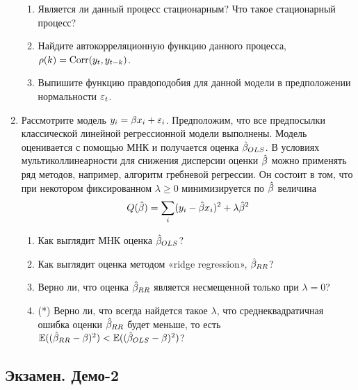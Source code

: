 \documentclass[12pt, a4paper]{article}
\theoremstyle{definition}
\begin{document}
\begin{enumerate}
\begin{enumerate}
\item Является ли данный процесс стационарным? Что такое стационарный процесс?
\item Найдите автокорреляционную функцию данного процесса, $\rho(k)=\operatorname{Corr}(y_t,y_{t-k})$.
\item Выпишите функцию правдоподобия для данной модели в предположении нормальности $\varepsilon_t$.
\end{enumerate}



\item Рассмотрите модель $y_i=\beta x_i+\varepsilon_i$. Предположим, что все предпосылки классической линейной регрессионной модели выполнены. Модель оценивается с помощью МНК и получается оценка $\hat{\beta}_{OLS}$.
В условиях мультиколлинеарности для снижения дисперсии оценки $\hat{\beta}$ можно применять ряд методов, например, алгоритм гребневой регрессии. Он состоит в том, что при некотором фиксированном $\lambda\geq 0$ минимизируется по $\hat{\beta}$ величина
\[
Q(\hat{\beta})=\sum_i (y_i-\hat{\beta} x_i)^2+\lambda \hat{\beta}^2
\]
\begin{enumerate}
\item Как выглядит МНК оценка $\hat{\beta}_{OLS}$?
\item Как выглядит оценка методом «ridge regression», $\hat{\beta}_{RR}$?
\item Верно ли, что оценка $\hat{\beta}_{RR}$ является несмещенной только при $\lambda=0$?
\item (*) Верно ли, что всегда найдется такое $\lambda$, что среднеквадратичная ошибка оценки $\hat{\beta}_{RR}$ будет меньше,
то есть $\operatorname{\mathbb{E}}((\hat{\beta}_{RR}-\beta)^2)<\operatorname{\mathbb{E}}((\hat{\beta}_{OLS}-\beta)^2)$?
\end{enumerate}


\end{enumerate}


\subsection{Экзамен. Демо-2}
\end{document}
